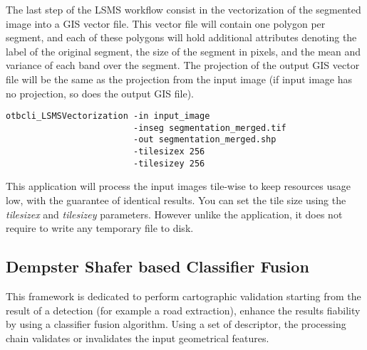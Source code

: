 The last step of the LSMS workflow consist in the vectorization of the
segmented image into a GIS vector file. This vector file will contain
one polygon per segment, and each of these polygons will hold
additional attributes denoting the label of the original segment, the
size of the segment in pixels, and the mean and variance of each band
over the segment. The projection of the output GIS vector file will be
the same as the projection from the input image (if input image has no
projection, so does the output GIS file).

\begin{verbatim}
otbcli_LSMSVectorization -in input_image 
                         -inseg segmentation_merged.tif 
                         -out segmentation_merged.shp 
                         -tilesizex 256 
                         -tilesizey 256
\end{verbatim}

This application will process the input images tile-wise
to keep resources usage low, with the guarantee of identical
results. You can set the tile size using the \emph{tilesizex} and
\emph{tilesizey} parameters. However unlike the
 application, it does not require to
write any temporary file to disk.

\subsection{Dempster Shafer based Classifier Fusion}\label{ssec:classifierfusion}

This framework is dedicated to perform cartographic validation starting
from the result of a detection (for example a road extraction), enhance
the results fiability by using a classifier fusion algorithm. Using a
set of descriptor, the processing chain validates or invalidates the
input geometrical features.

%

